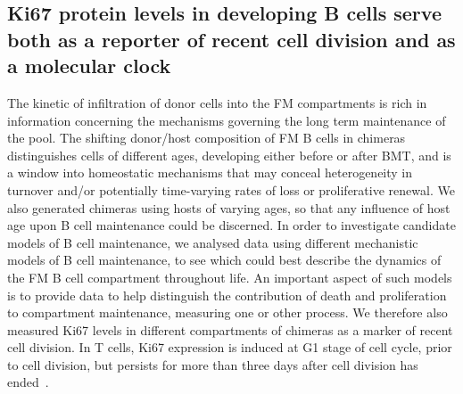 \documentclass[11pt,onecolumn]{article}
\begin{document}
\subsection*{Ki67 protein levels in developing B cells serve both as a reporter of recent cell division and as a molecular clock}
The kinetic of infiltration of donor cells into the FM compartments is rich in information concerning the mechanisms governing the long term maintenance of the pool.
The shifting donor/host composition of FM B cells in chimeras distinguishes cells of different ages, developing either before or after BMT, and is a window into homeostatic mechanisms that may conceal heterogeneity in turnover and/or potentially time-varying rates of loss or proliferative renewal. We also generated chimeras using hosts of varying ages, so that any influence of host age upon B cell maintenance could be discerned. In order to investigate candidate models of B cell maintenance, we analysed data using different mechanistic models of B cell maintenance, to see which could best describe the dynamics of the FM B cell compartment throughout life. An important aspect of  such models is to provide data to help distinguish the contribution of death and proliferation to compartment maintenance,  measuring one or other process. We therefore also measured Ki67 levels in different compartments of chimeras as a marker of recent cell division. In T cells, Ki67 expression is induced at G1 stage of cell cycle, prior to cell division, but persists for more than three days after cell division has ended~\citep{Gossel:2017iu,Hogan:2013id}. 
\end{document}
